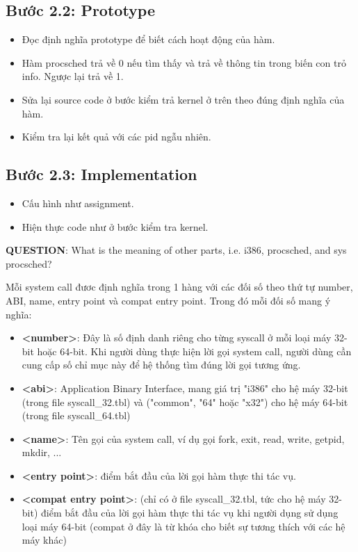 \subsection{Bước 2.2: Prototype}

\begin{itemize}
	\item Đọc định nghĩa prototype để biết cách hoạt động của hàm.
	\item Hàm procsched trả về 0 nếu tìm thấy và trả về thông tin trong biến con trỏ info. Ngược lại trả về 1.
	\item Sửa lại source code ở bước kiểm trả kernel ở trên theo đúng định nghĩa của hàm.
	\item Kiểm tra lại kết quả với các pid ngẫu nhiên.
\end{itemize}


\subsection{Bước 2.3: Implementation}

\begin{itemize}
	\item Cấu hình như assignment.
	\item Hiện thực code như ở bước kiểm tra kernel.
\end{itemize}


\textbf{QUESTION}: What is the meaning of other parts, i.e. i386, procsched, and sys procsched?

\vspace{0.2cm}

Mỗi system call đươc định nghĩa trong 1 hàng với các đối số theo thứ tự number, ABI, name, entry point và compat entry point.
Trong đó mỗi đối số mang ý nghĩa:

\begin{itemize}
	\item \textbf{<number>}: Đây là số định danh riêng cho từng syscall ở mỗi loại máy 32-bit hoặc 64-bit. Khi người dùng thực hiện lời gọi system call, người dùng cần cung cấp số chỉ mục này để hệ thống tìm đúng lời gọi tương ứng.
	\item \textbf{<abi>}: Application Binary Interface, mang giá trị "i386" cho hệ máy  32-bit (trong file syscall\_32.tbl) và ("common", "64" hoặc "x32") cho hệ máy 64-bit (trong file syscall\_64.tbl)
	\item \textbf{<name>}: Tên gọi của system call, ví dụ gọi fork, exit, read, write, getpid, mkdir, ...
	\item \textbf{<entry point>}: điểm bắt đầu của lời gọi hàm thực thi tác vụ.
	\item \textbf{<compat entry point>}: (chỉ có ở file syscall\_32.tbl, tức cho hệ máy 32-bit) điểm bắt đầu của lời gọi hàm thực thi tác vụ khi người dụng sử dụng loại máy 64-bit (compat ở đây là từ khóa cho biết sự tương thích với các hệ máy khác)
\end{itemize}

